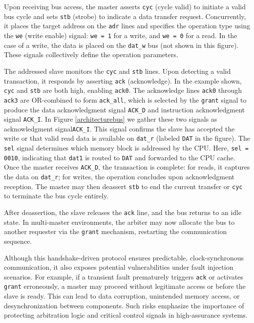 Upon receiving bus access, the master asserts \texttt{cyc} (cycle valid) to initiate a valid bus cycle and sets \texttt{stb} (strobe) to indicate a data transfer request. Concurrently, it places the target address on the \texttt{adr} lines and specifies the operation type using the \texttt{we} (write enable) signal: \texttt{we = 1} for a write, and \texttt{we = 0} for a read. In the case of a write, the data is placed on the \texttt{dat\_w} bus (not shown in this figure). These signals collectively define the operation parameters.

The addressed slave monitors the \texttt{cyc} and \texttt{stb} lines. Upon detecting a valid transaction, it responds by asserting \texttt{ack} (acknowledge). In the example shown, \texttt{cyc} and \texttt{stb} are both high, enabling \texttt{ack0}. The acknowledge lines \texttt{ack0} through \texttt{ack3} are OR-combined to form \texttt{ack\_all}, which is selected by the \texttt{grant} signal to produce the data acknowledgment signal \texttt{ACK\_D} and instruction acknowledgment signal \texttt{ACK\_I}. In Figure \ref{architecturebus} we gather these two signals as acknowledgment  signal\texttt{ACK\_I}. This signal confirms the slave has accepted the write or that valid read data is available on \texttt{dat\_r} (labeled \texttt{DAT} in the figure). The \texttt{sel} signal determines which memory block is addressed by the CPU. Here, \texttt{sel = 0010}, indicating that \texttt{dat1} is routed to \texttt{DAT} and forwarded to the CPU cache. Once the master receives \texttt{ACK\_D}, the transaction is complete: for reads, it captures the data on \texttt{dat\_r}; for writes, the operation concludes upon acknowledgment reception. The master may then deassert \texttt{stb} to end the current transfer or \texttt{cyc} to terminate the bus cycle entirely.

After deassertion, the slave releases the \texttt{ack} line, and the bus returns to an idle state. In multi-master environments, the arbiter may now allocate the bus to another requester via the \texttt{grant} mechanism, restarting the communication sequence.

Although this handshake-driven protocol ensures predictable, clock-synchronous communication, it also exposes potential vulnerabilities under fault injection scenarios. For example, if a transient fault prematurely triggers \texttt{ack} or activates \texttt{grant} erroneously, a master may proceed without legitimate access or before the slave is ready. This can lead to data corruption, unintended memory access, or desynchronization between components. Such risks emphasize the importance of protecting arbitration logic and critical control signals in high-assurance systems.

